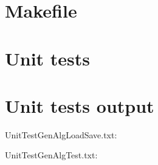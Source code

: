 \section{Makefile}

\begin{scriptsize}
\begin{ttfamily}

\end{ttfamily}
\end{scriptsize}

\section{Unit tests}

\begin{scriptsize}
\begin{ttfamily}

\end{ttfamily}
\end{scriptsize}

\section{Unit tests output}

\begin{scriptsize}
\begin{ttfamily}

\end{ttfamily}
\end{scriptsize}

UnitTestGenAlgLoadSave.txt:\\
\begin{scriptsize}
\begin{ttfamily}

\end{ttfamily}
\end{scriptsize}

UnitTestGenAlgTest.txt:\\
\begin{scriptsize}
\begin{ttfamily}

\end{ttfamily}
\end{scriptsize}


